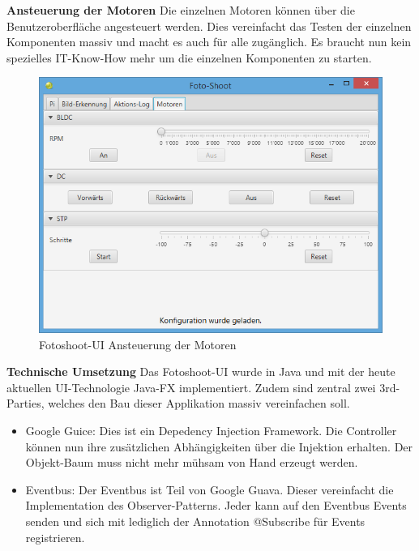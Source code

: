 \noindent
\textbf{Ansteuerung der Motoren}
Die einzelnen Motoren können über die Benutzeroberfläche angesteuert werden. Dies vereinfacht das Testen der einzelnen Komponenten massiv und macht es auch für alle zugänglich. Es braucht nun kein spezielles IT-Know-How mehr um die einzelnen Komponenten zu starten.

\begin{figure}[h!]
	\centering
	\includegraphics[width=0.7\linewidth]{../../fig/fotoshoot-ui/fotoshoot-ui-motoren}
	\caption{Fotoshoot-UI Ansteuerung der Motoren}
	\label{fig:fotoshoot-ui-motoren}
\end{figure}

\noindent
\textbf{Technische Umsetzung}
Das Fotoshoot-UI wurde in Java und mit der heute aktuellen UI-Technologie Java-FX implementiert. Zudem sind zentral zwei 3rd-Parties, welches den Bau dieser Applikation massiv vereinfachen soll.

\begin{itemize}
	\item Google Guice: Dies ist ein Depedency Injection Framework. Die Controller können nun ihre zusätzlichen Abhängigkeiten über die Injektion erhalten. Der Objekt-Baum muss nicht mehr mühsam von Hand erzeugt werden.
	\item Eventbus: Der Eventbus ist Teil von Google Guava. Dieser vereinfacht die Implementation des Observer-Patterns. Jeder kann auf den Eventbus Events senden und sich mit lediglich der Annotation @Subscribe für Events registrieren.
\end{itemize}
	
